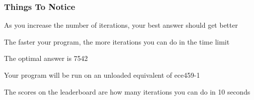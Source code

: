 \documentclass[aspectratio=169,10pt,compress]{beamer}
\begin{document}
\begin{frame}
  \frametitle{Things To Notice}

  As you increase the number of iterations, your best answer should get better

  \vspace{1em}
 
  The faster your program, the more iterations you can do in the time limit

  \vspace{1em}

  The optimal answer is 7542

  \vspace{2em}
      
  Your program will be run on an unloaded equivalent of {\ttfamily ece459-1}

  \vspace{1em}

  The scores on the leaderboard are how many iterations you can do in 10 seconds
\end{frame}

\end{document}
